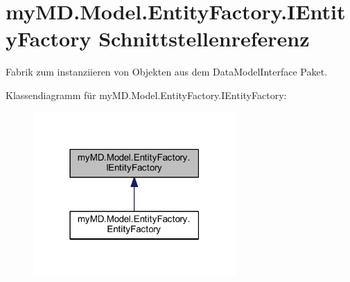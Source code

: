 \hypertarget{interfacemy_m_d_1_1_model_1_1_entity_factory_1_1_i_entity_factory}{}\section{my\+M\+D.\+Model.\+Entity\+Factory.\+I\+Entity\+Factory Schnittstellenreferenz}
\label{interfacemy_m_d_1_1_model_1_1_entity_factory_1_1_i_entity_factory}


Fabrik zum instanziieren von Objekten aus dem Data\+Model\+Interface Paket.  




Klassendiagramm für my\+M\+D.\+Model.\+Entity\+Factory.\+I\+Entity\+Factory\+:\nopagebreak
\begin{figure}[H]
\begin{center}
\leavevmode
\includegraphics[width=219pt]{interfacemy_m_d_1_1_model_1_1_entity_factory_1_1_i_entity_factory__inherit__graph}
\end{center}
\end{figure}

